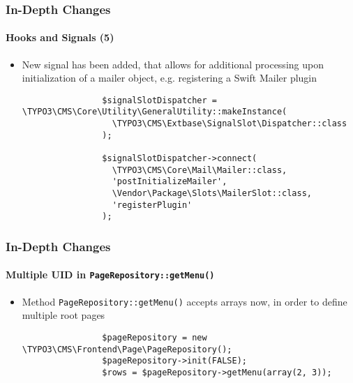
\begin{frame}[fragile]
	\frametitle{In-Depth Changes}
	\framesubtitle{Hooks and Signals (5)}

	\lstset{basicstyle=\tiny\ttfamily}

	\begin{itemize}

		\item New signal has been added, that allows for additional processing upon
			initialization of a mailer object, e.g. registering a Swift Mailer plugin

			\begin{lstlisting}
				$signalSlotDispatcher = \TYPO3\CMS\Core\Utility\GeneralUtility::makeInstance(
				  \TYPO3\CMS\Extbase\SignalSlot\Dispatcher::class
				);

				$signalSlotDispatcher->connect(
				  \TYPO3\CMS\Core\Mail\Mailer::class,
				  'postInitializeMailer',
				  \Vendor\Package\Slots\MailerSlot::class,
				  'registerPlugin'
				);
		\end{lstlisting}

	\end{itemize}

\end{frame}


\begin{frame}[fragile]
	\frametitle{In-Depth Changes}
	\framesubtitle{Multiple UID in \texttt{PageRepository::getMenu()}}

	\begin{itemize}


		\item Method \texttt{PageRepository::getMenu()} accepts arrays now, in order to
			define multiple root pages

			\begin{lstlisting}
				$pageRepository = new \TYPO3\CMS\Frontend\Page\PageRepository();
				$pageRepository->init(FALSE);
				$rows = $pageRepository->getMenu(array(2, 3));
			\end{lstlisting}

	\end{itemize}

\end{frame}

